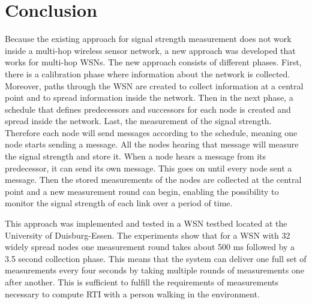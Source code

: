 \section{Conclusion}
Because the existing approach for signal strength measurement does not work inside a multi-hop wireless sensor network, a new approach was developed that works for multi-hop WSNs. The new approach consists of different phases. First, there is a calibration phase where information about the network is collected. Moreover, paths through the WSN are created to collect information at a central point and to spread information inside the network. Then in the next phase, a schedule that defines predecessors and successors for each node is created and spread inside the network. Last, the measurement of the signal strength. Therefore each node will send messages according to the schedule, meaning one node starts sending a message. All the nodes hearing that message will measure the signal strength and store it. When a node hears a message from its predecessor, it can send its own message. This goes on until every node sent a message. Then the stored measurements of the nodes are collected at the central point and a new measurement round can begin, enabling the possibility to monitor the signal strength of each link over a period of time.

This approach was implemented and tested in a WSN testbed located at the University of Duisburg-Essen. The experiments show that for a WSN with 32 widely spread nodes one measurement round takes about 500 ms followed by a 3.5 second collection phase. This means that the system can deliver one full set of measurements every four seconds by taking multiple rounds of measurements one after another. This is sufficient to fulfill the requirements of measurements necessary to compute RTI with a person walking in the environment.   